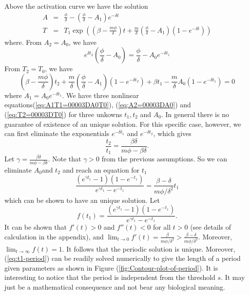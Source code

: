 \documentclass[review,authoryear]{elsarticle}
\begin{document}
Above the activation curve we have the solution 
\begin{eqnarray*}
A & = & \frac{\phi}{\delta}-(\frac{\phi}{\delta}-A_{1})e^{-\delta t}\\
T & = & T_{1}\exp((\beta-\frac{m\phi}{\delta})t+\frac{m}{\delta}(\frac{\phi}{\delta}-A_{1})(1-e^{-\delta t}))
\end{eqnarray*}
where. From $A_{2}=A_{0}$, we have 
\begin{equation}
e^{\delta t_{2}}(\frac{\phi}{\delta}-A_{0})=\frac{\phi}{\delta}-A_{0}e^{-\delta t_{1}}\label{eq:A2=00003DA0}
\end{equation}
From $T_{2}=T_{0}$, we have 
\begin{equation}
(\beta-\frac{m\phi}{\delta})t_{2}+\frac{m}{\delta}(\frac{\phi}{\delta}-A_{1})(1-e^{-\delta t_{2}})+\beta t_{1}-\frac{m}{\delta}A_{0}(1-e^{-\delta t_{1}})=0\label{eq:T2=00003DT0}
\end{equation}
where $A_{1}=A_{0}e^{-\delta t_{1}}$. We have three nonlinear equations(\ref{eq:A1T1=00003DA0T0}),
(\ref{eq:A2=00003DA0}) and (\ref{eq:T2=00003DT0}) for three unkowns
$t_{1},t_{2}$ and $A_{0}$. In general there is no guarantee of existence
of an unique solution. For this specific case, however, we can first
eliminate the exponentials $e^{-\delta t_{1}}$ and $e^{-\delta t_{2}}$,
which gives 
\[
\frac{t_{2}}{t_{1}}=\frac{\beta\delta}{m\phi-\beta\delta}.
\]
Let $\gamma=\frac{\beta\delta}{m\phi-\beta\delta}$. Note that $\gamma>0$
from the previous assumptions. So we can eliminate $A_{0}$and $t_{2}$
and reach an equation for $t_{1}$
\begin{equation}
\frac{(e^{\gamma t_{1}}-1)(1-e^{-t_{1}})}{e^{\gamma t_{1}}-e^{-t_{1}}}=\frac{\beta-\delta}{m\phi/\delta^{2}}t_{1}\label{eq:t1-period}
\end{equation}
which can be shown to have an unique solution. Let 
\begin{equation}
f(t_{1})=\frac{(e^{\gamma t_{1}}-1)(1-e^{-t_{1}})}{e^{\gamma t_{1}}-e^{-t_{1}}}.\label{eq:f(t1)}
\end{equation}
It can be shown that $f'(t)>0$ and $f''(t)<0$ for all $t>0$ (see
details of calculation in the appendix), and $\lim_{t\to0}f'(t)=\frac{\beta}{m\phi/\delta^{2}}>\frac{\beta-\delta}{m\phi/\delta^{2}}$.
Moreover, $\lim_{t\to\infty}f(t)=1$. It follows that the periodic
solution is unique. Moreover, (\ref{eq:t1-period}) can be readily
solved numerically to give the length of a period given parameters
as shown in Figure (\ref{fig:Contour-plot-of-period}). It is interesting
to notice that the period is independent from the threshold $s$.
It may just be a mathematical consequence and not bear any biological
meaning. 
\end{document}
